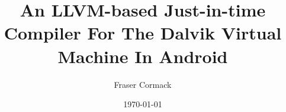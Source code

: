 \documentclass[twoside,abbrevs,bsc,logo,notimes,frontabs]{styles/infthesis}
\title{An LLVM-based Just-in-time Compiler For The Dalvik Virtual Machine In Android}
\author{Fraser Cormack}
\date{\today}
\begin{document}
    \begin{preliminary}
        \maketitle

        
        \standarddeclaration
        \tableofcontents
	    \listoffigures
	    \lstlistoflistings
	\end{preliminary}

	
	
		
	
	
	
	
	
	\appendix
	

	
	
\end{document}
